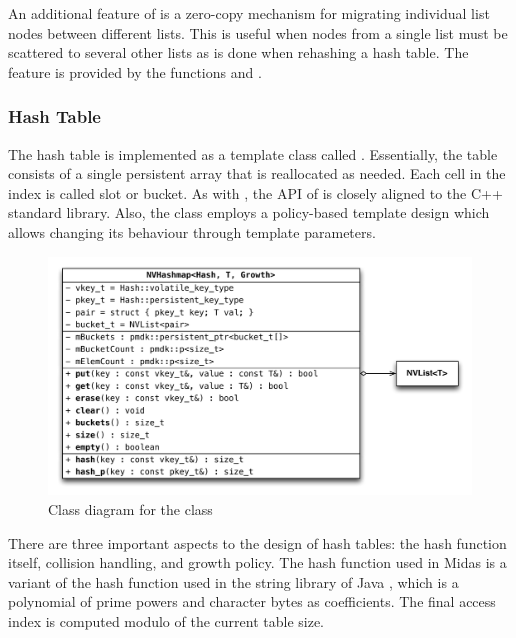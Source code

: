 An additional feature of  is a zero-copy mechanism for migrating
individual list nodes between different lists. This is useful when nodes from a
single list must be scattered to several other lists as is done when rehashing a
hash table. The feature is provided by the functions 
and .

\subsubsection{Hash Table}

The hash table is implemented as a template class called .
Essentially, the table consists of a single persistent array that is reallocated
as needed. Each cell in the index is called slot or bucket. As with
, the API of  is closely aligned to the C++
standard library. Also, the class employs a policy-based template design which
allows changing its behaviour through template parameters.

\begin{figure}[h!]
    \centering
    \includegraphics[scale=0.66]{figures/impl/map.pdf}
    \caption{Class diagram for the class }
    \label{fig:impl-map}
\end{figure}

There are three important aspects to the design of hash tables: the hash
function itself, collision handling, and growth policy. The hash function used
in Midas is a variant of the hash function used in the string library of Java
\cite{javadoc2018hashcode}, which is a polynomial of prime powers and character
bytes as coefficients. The final access index is computed modulo of the current
table size.

